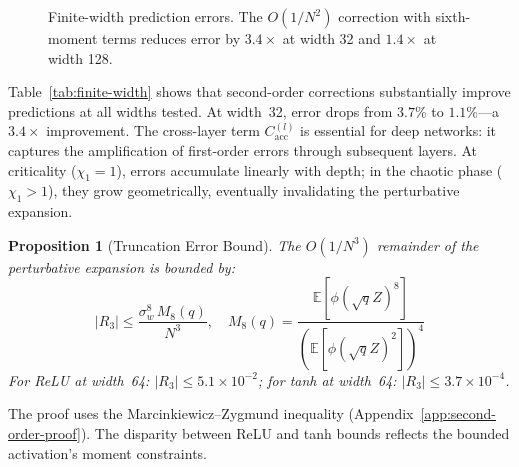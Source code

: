 \documentclass[10pt]{article}
\newcommand{\EE}{\mathbb{E}}
\newtheorem{proposition}[theorem]{Proposition}
\begin{document}
\begin{figure}[t]
\centering
{}
\caption{Finite-width prediction errors. The $O(1/N^2)$ correction with sixth-moment terms reduces error by $3.4\times$ at width 32 and $1.4\times$ at width 128.}
\label{fig:finite-width}
\end{figure}

Table~\ref{tab:finite-width} shows that second-order corrections substantially improve predictions at all widths tested.
At width~32, error drops from $3.7\%$ to $1.1\%$---a $3.4\times$ improvement.
The cross-layer term $C_{\mathrm{acc}}^{(l)}$ is essential for deep networks: it captures the amplification of first-order errors through subsequent layers.
At criticality ($\chi_1 = 1$), errors accumulate linearly with depth; in the chaotic phase ($\chi_1 > 1$), they grow geometrically, eventually invalidating the perturbative expansion.

\begin{proposition}[Truncation Error Bound]
\label{prop:truncation-bound}
The $O(1/N^3)$ remainder of the perturbative expansion is bounded by:
\begin{equation}
    |R_3| \leq \frac{\sigma_w^8\, M_8(q)}{N^3}, \quad M_8(q) = \frac{\EE[\phi(\sqrt{q}Z)^8]}{(\EE[\phi(\sqrt{q}Z)^2])^4}
    \label{eq:truncation-bound}
\end{equation}
For ReLU at width~64: $|R_3| \leq 5.1 \times 10^{-2}$; for tanh at width~64: $|R_3| \leq 3.7 \times 10^{-4}$.
\end{proposition}

The proof uses the Marcinkiewicz--Zygmund inequality (Appendix~\ref{app:second-order-proof}).
The disparity between ReLU and tanh bounds reflects the bounded activation's moment constraints.
\end{document}

